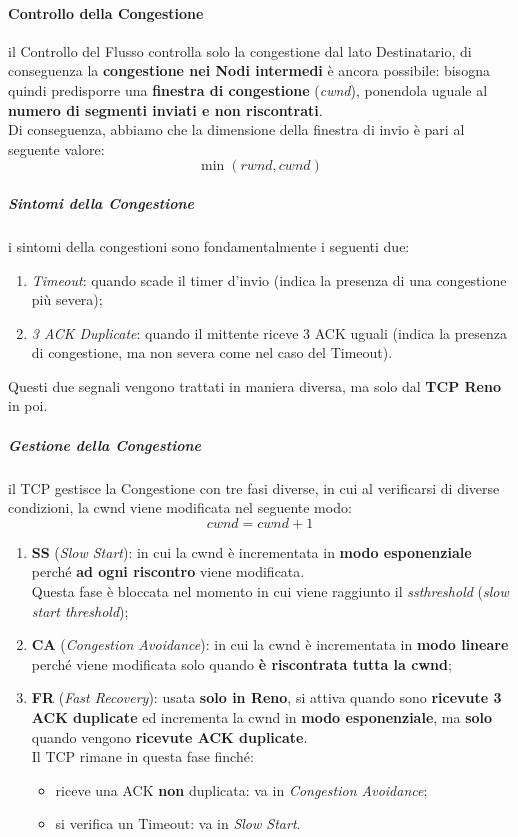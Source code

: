 \documentclass[a4paper]{article}
\begin{document}
				\paragraph{Controllo della Congestione}
					il Controllo del Flusso controlla solo la congestione dal lato Destinatario, di conseguenza la \textbf{congestione nei Nodi intermedi} è ancora possibile: bisogna quindi predisporre una \textbf{finestra di congestione} (\emph{cwnd}), ponendola uguale al \textbf{numero di segmenti inviati e non riscontrati}.
					\\
					Di conseguenza, abbiamo che la dimensione della finestra di invio è pari al seguente valore:
					\[ \min(rwnd, cwnd) \]
					
					\subparagraph{Sintomi della Congestione}
						i sintomi della congestioni sono fondamentalmente i seguenti due:
						\begin{enumerate}
							\item \emph{Timeout}: quando scade il timer d'invio (indica la presenza di una congestione più severa);
							\item \emph{3 ACK Duplicate}: quando il mittente riceve 3 ACK uguali (indica la presenza di congestione, ma non severa come nel caso del Timeout).
						\end{enumerate}
						
						Questi due segnali vengono trattati in maniera diversa, ma solo dal \textbf{TCP Reno} in poi.
						
						
					\subparagraph{Gestione della Congestione}
						il TCP gestisce la Congestione con tre fasi diverse, in cui al verificarsi di diverse condizioni, la cwnd viene modificata nel seguente modo:
						\[ cwnd = cwnd + 1 \]
						\begin{enumerate}
							\item \textbf{SS} (\emph{Slow Start}): in cui la cwnd è incrementata in \textbf{modo esponenziale} perché \textbf{ad ogni riscontro} viene modificata.\\					
								Questa fase è bloccata nel momento in cui viene raggiunto il \emph{ssthreshold} (\emph{slow start threshold});
							\item \textbf{CA} (\emph{Congestion Avoidance}): in cui la cwnd è incrementata in \textbf{modo lineare} perché viene modificata solo quando \textbf{è riscontrata tutta la cwnd};\\
							\item \textbf{FR} (\emph{Fast Recovery}): usata \textbf{solo in Reno}, si attiva quando sono \textbf{ricevute 3 ACK duplicate} ed incrementa la cwnd in \textbf{modo esponenziale}, ma \textbf{solo} quando vengono \textbf{ricevute ACK duplicate}.\\
								Il TCP rimane in questa fase finché:
								\begin{itemize}
									\item riceve una ACK \textbf{non} duplicata: va in \emph{Congestion Avoidance};
									\item si verifica un Timeout: va in \emph{Slow Start}.
								\end{itemize}
						\end{enumerate}
						
\end{document}
